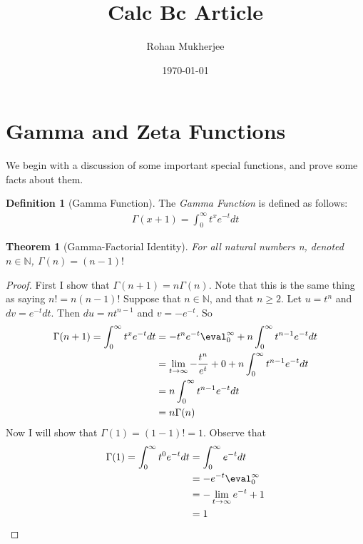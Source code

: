 \documentclass[12pt]{article}
\title{Calc Bc Article}
\date{\today}
\author{Rohan Mukherjee}
\def\mbb#1{\mathbb{#1}}
\def\bN{\mbb{N}}
\newtheorem{theorem}{Theorem}[section]
\theoremstyle{definition}
\newtheorem{definition}{Definition}[section]
\theoremstyle{remark}
\newcommand{\indef}{\int_{0}^{\infty}}
\begin{document}
    \maketitle

    \section{Gamma and Zeta Functions}
    We begin with a discussion of some important special functions, and prove some facts about them.
    \begin{definition}[Gamma Function]\label{Gamma}
        The \textit{Gamma Function} is defined as follows:
        \begin{align*}
            \Gamma(x+1) = \indef t^xe^{-t}dt
        \end{align*}    
    \end{definition}

    \begin{theorem}[Gamma-Factorial Identity]
        For all natural numbers n, denoted $n \in \bN$, $\Gamma(n) = (n-1)!$
    \end{theorem}

    \begin{proof}
        First I show that $\Gamma(n+1)=n\Gamma(n)$. 
        Note that this is the same thing as saying $n! = n(n-1)!$
        Suppose that $n \in \bN$, and that $n \geq 2$. 
        Let $u = t^n$ and $dv = e^{-t}dt$. Then $du = nt^{n-1}$ and $v = -e^{-t}$. So 
        \begin{align*}
            \Gamma(n+1) = \indef t^xe^{-t}dt &= -t^ne^{-t}\eval_{0}^{\infty} + n\indef t^{n-1}e^{-t}dt \\ 
            &= \lim_{t \to \infty} -\frac{t^n}{e^{t}} + 0 + n\indef t^{n-1}e^{-t}dt \\ 
            &= n\indef t^{n-1}e^{-t}dt \\ 
            &= n\Gamma(n)
        \end{align*}
        Now I will show that $\Gamma(1) = (1-1)! = 1$. Observe that
        \begin{align*}
           \Gamma(1) = \indef t^{0}e^{-t}dt &= \indef e^{-t}dt \\ 
           &= -e^{-t} \eval_{0}^{\infty} \\ 
           &= -\lim_{t \to \infty} e^{-t} + 1 \\ 
           &= 1
        \end{align*}
    \end{proof}
\end{document}
